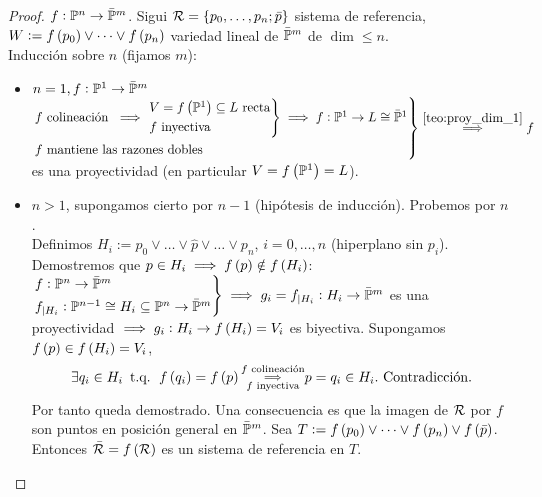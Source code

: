 \begin{proof}
	$f : \mathbb{P}^n \to \bar{\mathbb{P}}^m$. Sigui $\mathcal{R} = \{ p_0, \dots, p_n; \bar{p} \}$ sistema de referencia, $W := f \left( p_0 \right) \vee \dots \vee f \left( p_n \right)$ variedad lineal de $\bar{\mathbb{P}}^m$ de $\dim \leq n$. \\
	Inducción sobre $n$ (fijamos $m$):
	\begin{itemize}
		\item $n = 1, f : \mathbb{P}^1 \to \bar{\mathbb{P}}^m$ \\
		$\begin{rcases}
			f \text{ colineación } \implies 
			\begin{rcases}
				V = f \left( \mathbb{P}^1 \right) \subseteq L \text{ recta} \\
				f \text{ inyectiva}
			\end{rcases}
			\implies f : \mathbb{P}^1 \to L \cong \bar{\mathbb{P}}^1 \\
			f \text{ mantiene las razones dobles}
		\end{rcases}
		\stackrel{\ref{teo:proy_dim_1}}{\implies} f$ es una proyectividad (en particular $V = f \left( \mathbb{P}^1 \right) = L$).
		\item $n > 1$, supongamos cierto por $n-1$ (hipótesis de inducción). Probemos por $n$. \\
		Definimos $H_i := p_0 \vee \dots \vee \hat{p} \vee \dots \vee p_n$, $i = 0, \dots, n$ (hiperplano sin $p_i$). Demostremos que $p \in H_i \implies f \left( p \right) \notin f \left( H_i \right)$: \\
		$\begin{rcases}
			f : \mathbb{P}^n \to \bar{\mathbb{P}}^m \\
			f_{|H_i} : \mathbb{P}^{n-1} \cong H_i \subseteq \mathbb{P}^n \to \bar{\mathbb{P}}^m
		\end{rcases}
		\implies g_i = f_{|H_i} : H_i \to \bar{\mathbb{P}}^m$ es una proyectividad $\implies g_i : H_i \to f \left( H_i \right) = V_i$ es biyectiva. Supongamos $f \left( p \right) \in f \left( H_i \right) = V_i$,
		\[
			\exists q_i \in H_i \operatorname{\text{ t.q. }} f \left( q_i \right) = f \left( p \right) \substack{f \text{ colineación} \\ \implies \\ f \text{ inyectiva}} p = q_i \in H_i. \text{ Contradicción.}
		\]
		Por tanto queda demostrado. Una consecuencia es que la imagen de $\mathcal{R}$ por $f$ son puntos en posición general en $\bar{\mathbb{P}}^m$. Sea $T := f \left( p_0 \right) \vee \dots \vee f \left( p_n \right) \vee f \left( \bar{p} \right)$. Entonces $\bar{\mathcal{R}} = f \left( \mathcal{R} \right)$ es un sistema de referencia en $T$.
		

\end{itemize}
\end{proof}
